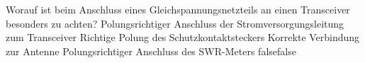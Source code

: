     {Worauf ist beim Anschluss eines Gleichspannungsnetzteils an einen Transceiver  besonders zu achten?}
    {Polungsrichtiger Anschluss der Stromversorgungsleitung zum Transceiver}
    {Richtige Polung des Schutzkontaktsteckers}
    {Korrekte Verbindung zur Antenne}
    {Polungsrichtiger Anschluss des SWR-Meters}
    {false}{false}